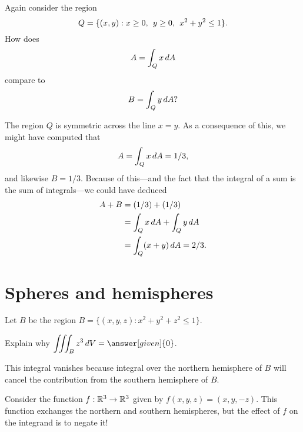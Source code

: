 \documentclass{ximera}
\begin{document}
\begin{question}
  Again consider the region
  \[
    Q = \{ (x,y)  : x \geq 0,\hspace{1ex} y \geq 0,\hspace{1ex} x^2 + y^2 \leq 1 \}.
  \]
  How does
  \[
    A = \int_Q x \mathop{}\!d A  
  \]
  compare to 
  \[
    B = \int_Q y \mathop{}\!d A?
  \]

  \begin{multipleChoice}
  \end{multipleChoice}

  \begin{feedback}[correct]
    The region $Q$ is symmetric across the line $x = y$.  As a consequence of this, we might have computed that
    \[
      A = \int_Q x \mathop{}\!d A = 1/3,
    \]
    and likewise $B = 1/3$.  Because of this---and the fact that the integral of a sum is the sum of integrals---we could have deduced
    \begin{align*}
      A + B &= (1/3) + (1/3) \\
            &= \int_Q x \mathop{}\!d A + \int_Q y \mathop{}\!d A \\
            &= \int_Q (x+y) \mathop{}\!d A = 2/3.
    \end{align*}
  \end{feedback}
\end{question}

\section{Spheres and hemispheres}

\begin{example}
  Let $B$ be the region $B = \{ (x,y,z)  : x^2 + y^2 + z^2 \leq 1\}$.

  Explain why $\displaystyle\iiint_B z^3 \d V = \answer[given]{0}$.

  \begin{explanation}
    This integral vanishes because integral over the northern
    hemisphere of $B$ will cancel the contribution from the southern
    hemisphere of $B$.

    Consider the function $f : \mathbb R^3 \to \mathbb R^3$ given by
    $f(x,y,z) = (x,y,-z)$.  This function exchanges the northern and
    southern hemispheres, but the effect of $f$ on the integrand is to
    negate it!
  \end{explanation}
\end{example}
\end{document}
